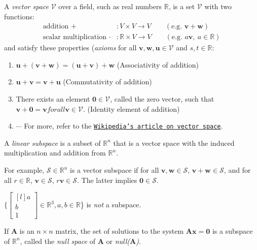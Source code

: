 \begin{definition}
 A \emph{vector space} $\mathcal{V}$ over a field, such as real numbers $\mathbb{R}$, is a set $\mathcal{V}$ with two functions:
\begin{align}
    \text{addition }+&: V \times V \rightarrow V \qquad (\text{e.g. }\bm{v}+\bm{w})\\
    \text{scalar multiplication }\cdot&: \mathbb{R} \times V \rightarrow V \qquad (\text{e.g. }a\bm{v},\ a\in\mathbb{R})
\end{align}
and satisfy these properties (\emph{axioms} for all $\bm{v},\bm{w},\bm{u}\in \mathcal{V}$ and $s,t\in\mathbb{R}$:
\begin{enumerate}[label=\theenumi)]
    \item $\bm{u}+(\bm{v}+\bm{w})=(\bm{u}+\bm{v})+\bm{w}$ (Associativity of addition)
    \item $\bm{u}+\bm{v}=\bm{v}+\bm{u}$ (Commutativity of addition)
    \item There exists an element $\bm{0} \in \mathcal{V}$, called the zero vector, such that $\bm{v} + \bm{0} = \bm{v} for all \bm{v} \in \mathcal{V}$. (Identity element of addition)
    \item $\cdots$ For more, refer to the \href{https://en.wikipedia.org/wiki/Vector_space}{\texttt{Wikipedia's article on vector space}}.
\end{enumerate}
\end{definition}

\begin{definition}[Subspace]
 A \emph{linear  subspace} is a subset of $\mathbb{R}^n$ that is a vector space with the induced multiplication and addition from $\mathbb{R}^n$.
\end{definition}
For example, $\mathcal{S}\in\mathbb{R}^n$ is a vector subspace if for all $\bm{v},\bm{w}\in\mathcal{S}$, $\bm{v}+\bm{w}\in\mathcal{S}$, and for all $r\in\mathbb{R}$, $\bm{v}\in\mathcal{S}$, $r\bm{v}\in\mathcal{S}$. The latter implies $\bm{0}\in\mathcal{S}$.

$\Bigg\{\begin{bmatrix*}[l]a\\b\\1\end{bmatrix*} \in \mathbb{R}^3, a,b\in\mathbb{R}$\Bigg\} is \emph{not} a subspace.

\begin{definition}
If $\bm{A}$ is an $n\times n $ matrix, the set of solutions to the system $\bm{Ax}=\bm{0}$ is a subspace of $\mathbb{R}^n$, called the \emph{null space} of $\bm{A}$ or \emph{null($\bm{A}$)}.
\end{definition}

